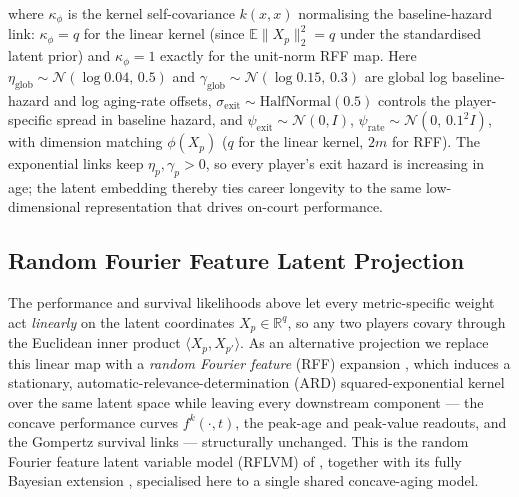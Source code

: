 where $\kappa_\phi$ is the kernel self-covariance $k(x,x)$ normalising the baseline-hazard link: $\kappa_\phi = q$ for the linear kernel (since $\mathbb{E}\lVert X_p \rVert_2^2 = q$ under the standardised latent prior) and $\kappa_\phi = 1$ exactly for the unit-norm RFF map.  Here $\eta_{\text{glob}} \sim \mathcal{N}(\log 0.04,\, 0.5)$ and $\gamma_{\text{glob}} \sim \mathcal{N}(\log 0.15,\, 0.3)$ are global log baseline-hazard and log aging-rate offsets, $\sigma_{\text{exit}} \sim \mathrm{HalfNormal}(0.5)$ controls the player-specific spread in baseline hazard, and $\psi_{\text{exit}} \sim \mathcal{N}(0, I)$, $\psi_{\text{rate}} \sim \mathcal{N}(0,\, 0.1^2 I)$, with dimension matching $\phi(X_p)$ ($q$ for the linear kernel, $2m$ for RFF).  The exponential links keep $\eta_p, \gamma_p > 0$, so every player's exit hazard is increasing in age; the latent embedding thereby ties career longevity to the same low-dimensional representation that drives on-court performance.

\subsection{Random Fourier Feature Latent Projection}
\label{sec:rff}

The performance and survival likelihoods above let every metric-specific weight act \emph{linearly} on the latent coordinates $X_p \in \mathbb{R}^q$, so any two players covary through the Euclidean inner product $\langle X_p, X_{p'}\rangle$.  As an alternative projection we replace this linear map with a \emph{random Fourier feature} (RFF) expansion \cite{rffs}, which induces a stationary, automatic-relevance-determination (ARD) squared-exponential kernel over the same latent space while leaving every downstream component --- the concave performance curves $f^k(\cdot, t)$, the peak-age and peak-value readouts, and the Gompertz survival links --- structurally unchanged.  This is the random Fourier feature latent variable model (RFLVM) of \cite{gundersen2021latent}, together with its fully Bayesian extension \cite{zhang2023bayesiannonlinearlatentvariable}, specialised here to a single shared concave-aging model.

